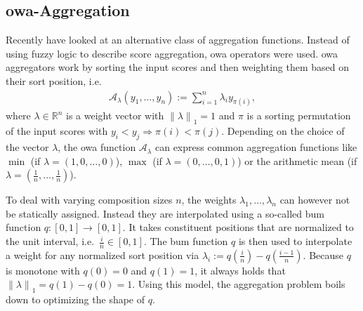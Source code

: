 \subsection{\acs*{owa}-Aggregation}%
\label{sec:related:lta:owa}

Recently \citet{Melnikov2019} have looked at an alternative class of aggregation functions.
Instead of using fuzzy logic to describe score aggregation, \ac{owa} operators were used.
\ac{owa} aggregators work by sorting the input scores and then weighting them based on their sort position, i.e.\ %
\begin{align}
	\mathcal{A}_{\lambda}(y_1, \dots, y_n) := \sum_{i = 1}^n \lambda_i y_{\pi(i)},
\end{align}
where $\lambda \in \mathbb{R}^n$ is a weight vector with ${\|\lambda\|}_1 = 1$ and $\pi$ is a sorting permutation of the input scores with $y_i < y_j \Rightarrow \pi(i) < \pi(j)$. %
Depending on the choice of the vector $\lambda$, the \ac{owa} function $\mathcal{A}_\lambda$ can express common aggregation functions like
$\min$ (if $\lambda = (1, 0, \dots, 0)$),
$\max$ (if $\lambda = (0, \dots, 0, 1)$)
or the arithmetic mean (if $\lambda = \left(\frac{1}{n}, \dots, \frac{1}{n}\right)$).

To deal with varying composition sizes $n$, the weights $\lambda_1, \dots, \lambda_n$ can however not be statically assigned.
Instead they are interpolated using a so-called \ac{bum} function $q: [0, 1] \to [0, 1]$.
It takes constituent positions that are normalized to the unit interval, i.e.\ $\frac{i}{n} \in [0, 1]$.
The \ac{bum} function $q$ is then used to interpolate a weight for any normalized sort position via $\lambda_i := q\left(\frac{i}{n}\right) - q\left(\frac{i - 1}{n}\right)$.
Because $q$ is monotone with $q(0) = 0$ and $q(1) = 1$, it always holds that ${\|\lambda\|}_1 = q(1) - q(0) = 1$. %
Using this model, the aggregation problem boils down to optimizing the shape of $q$.

